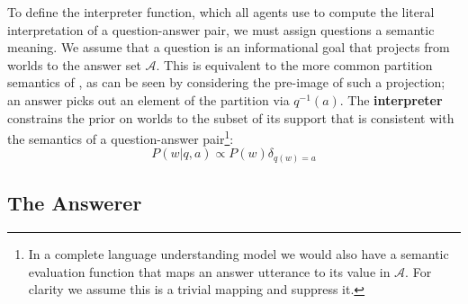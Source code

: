\documentclass[12pt, floatsintext, jou]{apa6}
\begin{document}
To define the interpreter function, which all agents use to compute the literal interpretation of a question-answer pair, we must assign questions a semantic meaning.
We assume that a question is an informational goal that projects from worlds to the answer set $\mathcal{A}$.
This is equivalent to the more common partition semantics of , as can be seen by considering the pre-image of such a projection; an answer picks out an element of the partition via $q^{-1}(a)$.
The \textbf{interpreter} constrains the prior on worlds to the subset of its support that is consistent with the semantics of a question-answer pair\footnote{In a complete language understanding model we would also have a semantic evaluation function that maps an answer utterance to its value in $\mathcal{A}$. For clarity we assume this is a trivial mapping and suppress it.}:
%
$$P(w | q, a) \propto P(w) \delta_{q(w)=a}$$

\subsection{The Answerer}
\end{document}
